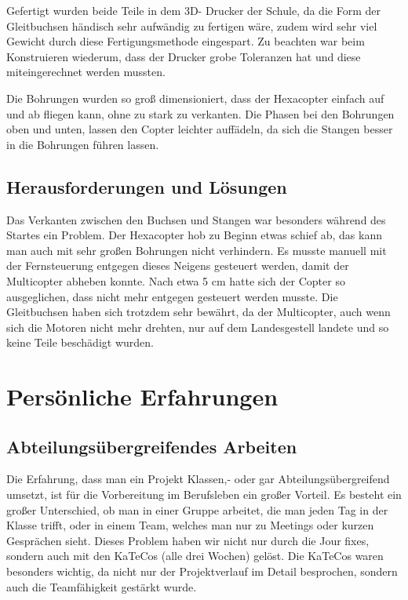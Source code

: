 			\newpage

	Gefertigt wurden beide Teile in dem 3D- Drucker der Schule, da die Form der Gleitbuchsen händisch sehr aufwändig zu fertigen wäre, zudem wird sehr viel Gewicht durch diese Fertigungsmethode eingespart.
	Zu beachten war beim Konstruieren wiederum, dass der Drucker grobe Toleranzen hat und diese miteingerechnet werden mussten.

	Die Bohrungen wurden so groß dimensioniert, dass der Hexacopter einfach auf und ab fliegen kann, ohne zu stark zu verkanten.
	Die Phasen bei den Bohrungen oben und unten, lassen den Copter leichter auffädeln, da sich die Stangen besser in die Bohrungen führen lassen.

	\subsection{Herausforderungen und Lösungen}

	Das Verkanten zwischen den Buchsen und Stangen war besonders während des Startes ein Problem.
	Der Hexacopter hob zu Beginn etwas  schief ab, das kann man auch mit sehr großen Bohrungen nicht verhindern.
	Es musste manuell mit der Fernsteuerung entgegen dieses Neigens gesteuert werden, damit der Multicopter abheben konnte.
	Nach etwa 5 cm hatte sich der Copter so ausgeglichen, dass nicht mehr entgegen gesteuert werden musste.
	Die Gleitbuchsen haben sich trotzdem sehr bewährt, da der Multicopter, auch wenn sich die Motoren nicht mehr drehten, nur auf dem Landesgestell landete und so keine Teile beschädigt wurden.

			\newpage

\section{Persönliche Erfahrungen}

	\subsection{Abteilungsübergreifendes Arbeiten}

	Die Erfahrung, dass man ein Projekt Klassen,- oder gar Abteilungsübergreifend umsetzt, ist für die Vorbereitung im Berufsleben ein großer Vorteil.
	Es besteht ein großer Unterschied, ob man in einer Gruppe arbeitet, die man jeden Tag in der Klasse trifft, oder in einem Team, welches man nur zu Meetings oder kurzen Gesprächen sieht.
	Dieses Problem haben wir nicht nur durch die Jour fixes, sondern auch mit den KaTeCos (alle drei Wochen) gelöst.
	Die KaTeCos waren besonders wichtig, da nicht nur der Projektverlauf im Detail besprochen, sondern auch die Teamfähigkeit gestärkt wurde.

